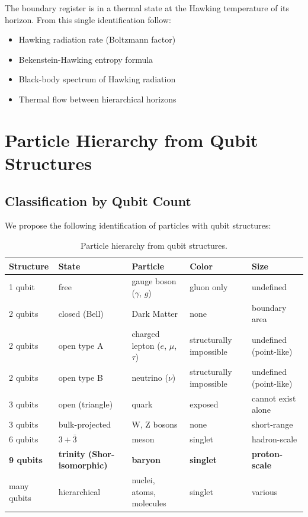 \documentclass[11pt,a4paper]{article}
\begin{document}
The boundary register is in a thermal state at the Hawking temperature of its horizon. From this single identification follow:
\begin{itemize}[leftmargin=*]
\item Hawking radiation rate (Boltzmann factor)
\item Bekenstein-Hawking entropy formula
\item Black-body spectrum of Hawking radiation
\item Thermal flow between hierarchical horizons
\end{itemize}

\section{Particle Hierarchy from Qubit Structures}
\label{sec:hierarchy}

\subsection{Classification by Qubit Count}

We propose the following identification of particles with qubit structures:

\begin{table}[h]
\centering
\small
\begin{tabular}{lllll}
\toprule
\textbf{Structure} & \textbf{State} & \textbf{Particle} & \textbf{Color} & \textbf{Size} \\
\midrule
1 qubit & free & gauge boson ($\gamma$, $g$) & gluon only & undefined \\
2 qubits & closed (Bell) & Dark Matter & none & boundary area \\
2 qubits & open type A & charged lepton ($e$, $\mu$, $\tau$) & structurally impossible & undefined (point-like) \\
2 qubits & open type B & neutrino ($\nu$) & structurally impossible & undefined (point-like) \\
3 qubits & open (triangle) & quark & exposed & cannot exist alone \\
3 qubits & bulk-projected & W, Z bosons & none & short-range \\
6 qubits & $3 + \bar{3}$ & meson & singlet & hadron-scale \\
\textbf{9 qubits} & \textbf{trinity (Shor-isomorphic)} & \textbf{baryon} & \textbf{singlet} & \textbf{proton-scale} \\
many qubits & hierarchical & nuclei, atoms, molecules & singlet & various \\
\bottomrule
\end{tabular}
\caption{Particle hierarchy from qubit structures.}
\label{tab:hierarchy}
\end{table}
\end{document}
